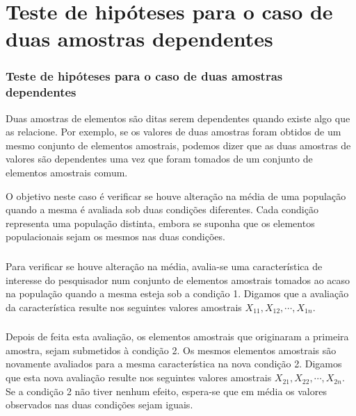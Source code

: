 \documentclass[14pt,aspectratio=1610]{beamer}
\begin{document}
\section{Teste de hipóteses para o caso de duas amostras dependentes}
\begin{frame}{}
\frametitle{Teste de hipóteses para o caso de duas amostras dependentes}
\small
\begin{block}{}
\justifying
Duas amostras de elementos são ditas serem dependentes quando existe algo que as relacione. Por exemplo, se os valores de duas amostras foram obtidos de um mesmo conjunto de elementos amostrais, podemos dizer que as duas amostras de valores são dependentes uma vez que foram tomados de um conjunto de elementos
amostrais comum.
\end{block}
\pause
\begin{block}{}
\justifying
O objetivo neste caso é verificar se houve alteração na média de uma população
quando a mesma é avaliada sob duas condições diferentes. Cada condição representa
uma população distinta, embora se suponha que os elementos populacionais sejam os
mesmos nas duas condições.
\end{block}
\end{frame}

\begin{frame}{}
\frametitle{}
\begin{block}{}
\justifying
Para verificar se houve alteração na média, avalia-se uma característica de interesse do pesquisador num conjunto de elementos amostrais tomados ao acaso na população quando a mesma esteja sob a condição 1. Digamos que a avaliação da característica resulte nos seguintes valores amostrais $X_{11},X_{12},\cdots,X_{1n}$.
\end{block}
\end{frame}

\begin{frame}{}
\frametitle{}
\begin{block}{}
\justifying
Depois de feita esta avaliação, os elementos amostrais que originaram a primeira amostra, sejam submetidos à condição 2. Os mesmos elementos amostrais são novamente avaliados para a mesma característica na nova condição 2. Digamos que esta nova avaliação resulte nos seguintes valores amostrais $X_{21},X_{22},\cdots,X_{2n}$. 
Se a condição 2 não tiver nenhum efeito, espera-se que em média os valores observados nas duas condições sejam iguais.
\end{block}
\end{frame}
\end{document}
